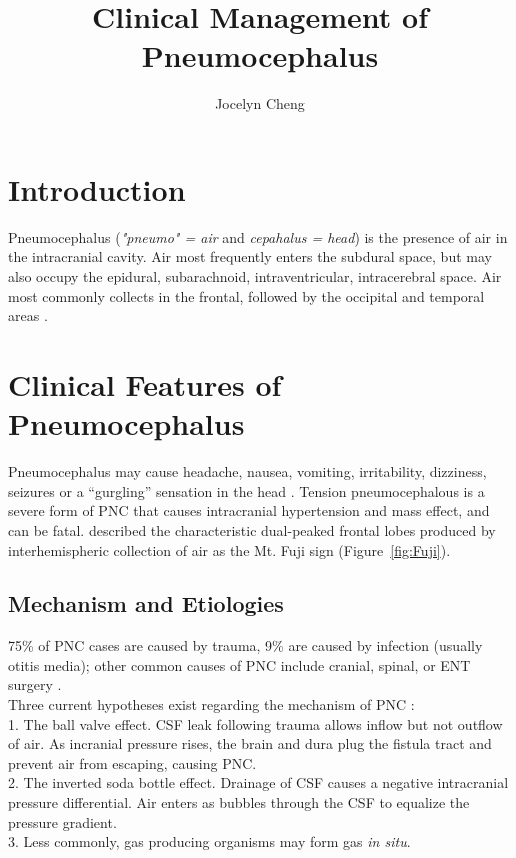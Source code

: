 \documentclass[fleqn,10pt]{olplainarticle}
\title{Clinical Management of Pneumocephalus}
\author{Jocelyn Cheng}
\affil{MS3, Warren Alpert Medical School of Brown University}
\begin{document}
\flushbottom
\maketitle
\thispagestyle{empty}

\section*{Introduction}

Pneumocephalus (\textit{"pneumo" = air} and \textit{cepahalus = head}) is the presence of air in the intracranial cavity. Air most frequently enters the subdural space, but may also occupy the epidural, subarachnoid, intraventricular, intracerebral space. Air most commonly collects in the frontal, followed by the occipital and temporal areas \citep{pmid23607059}.

\section*{Clinical Features of Pneumocephalus}
\label{sec:examples}
Pneumocephalus may cause headache, nausea, vomiting, irritability, dizziness, seizures or a “gurgling” sensation in the head  \citep{pmid15953284}. Tension pneumocephalous is a severe form of PNC that causes intracranial hypertension and mass effect, and can be fatal. \cite{pmid3335913} described the characteristic dual-peaked frontal lobes produced by interhemispheric collection of air as the Mt. Fuji sign (Figure~\ref{fig:Fuji}). 

\subsection*{Mechanism and Etiologies}
75\% of PNC cases are caused by trauma, 9\% are caused by infection (usually otitis media); other common causes of PNC include cranial, spinal, or ENT surgery \citep{pmid6032371}. 
\\
Three current hypotheses exist regarding the mechanism of PNC \citep{pmid26500801}: 
\\1. The ball valve effect. CSF leak following trauma allows inflow but not outflow of air. As incranial pressure rises, the brain and dura plug the fistula tract and prevent air from escaping, causing PNC.
\\2. The inverted soda bottle effect. Drainage of CSF causes a negative intracranial pressure differential. Air enters as bubbles through the CSF to equalize the pressure gradient.
\\3. Less commonly, gas producing organisms may form gas \textit{in situ}.
\end{document}
